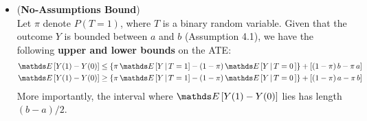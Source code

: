 \documentclass[11pt]{article}
\begin{document}
\begin{itemize}
\item \begin{proposition} (\textbf{No-Assumptions Bound})  \citep{neal2020introduction}\\
Let $\pi$ denote $P(T = 1)$, where $T$ is a binary random variable. Given that the outcome $Y$ is bounded between $a$ and $b$ (Assumption 4.1), we have the following \textbf{upper and lower bounds} on the ATE:
\begin{align}
\E{}{Y(1) - Y(0)} \le \set{\pi\, \E{}{Y \,|\, T = 1} - (1-\pi)\, \E{}{Y\,|\, T = 0\,}} + \brac{(1-\pi)\,b - \pi \,a} \label{eqn: no_assumption_upper_bound}\\
\E{}{Y(1) - Y(0)} \ge \set{\pi\, \E{}{Y \,|\, T = 1} - (1-\pi)\, \E{}{Y\,|\, T = 0\,}} + \brac{(1-\pi)\,a - \pi \,b} \label{eqn: no_assumption_lower_bound}
\end{align} More importantly, the interval where $\E{}{Y(1) - Y(0)}$ lies has length $(b-a) / 2$.
\end{proposition}

\end{itemize}
\end{document}

